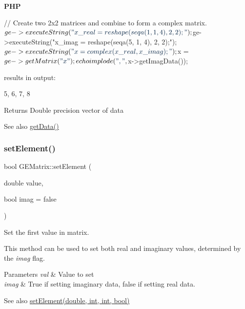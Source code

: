 {\bfseries P\+HP} 
\begin{DoxyCode}
\textcolor{comment}{// Create two 2x2 matrices and combine to form a complex matrix.}
$ge->executeString(\textcolor{stringliteral}{"x\_real = reshape(seqa(1, 1, 4), 2, 2);"});
$ge->executeString(\textcolor{stringliteral}{"x\_imag = reshape(seqa(5, 1, 4), 2, 2);"});
$ge->executeString(\textcolor{stringliteral}{"x = complex(x\_real, x\_imag);"});
$x = $ge->getMatrix(\textcolor{stringliteral}{"x"});
echo implode(\textcolor{stringliteral}{", "}, $x->getImagData());
\end{DoxyCode}
 results in output\+: 
\begin{DoxyCode}
5, 6, 7, 8
\end{DoxyCode}


\begin{DoxyReturn}{Returns}
Double precision vector of data
\end{DoxyReturn}
\begin{DoxySeeAlso}{See also}
\hyperlink{class_g_e_matrix_a49482e136fe25e61e8afc3eb2355146b}{get\+Data()} 
\end{DoxySeeAlso}
\mbox{\label{class_g_e_matrix_a9cb8b883469fb739b326d4d4a6ca9b4f}} 
\subsubsection{\texorpdfstring{set\+Element()}{setElement()}\hspace{0.1cm}{\footnotesize\ttfamily [1/3]}}
{\footnotesize\ttfamily bool G\+E\+Matrix\+::set\+Element (\begin{DoxyParamCaption}\item[{double}]{value,  }\item[{bool}]{imag = {\ttfamily false} }\end{DoxyParamCaption})}



Set the first value in matrix. 

This method can be used to set both real and imaginary values, determined by the {\itshape imag} flag.


\begin{DoxyParams}{Parameters}
{\em val} & Value to set \\
\hline
{\em imag} & True if setting imaginary data, false if setting real data.\\
\hline
\end{DoxyParams}
\begin{DoxySeeAlso}{See also}
\hyperlink{class_g_e_matrix_aaadecf68d646c2575446e7c1e2307047}{set\+Element(double, int, int, bool)} 
\end{DoxySeeAlso}
\mbox{\label{class_g_e_matrix_a10f13d07ac7a962d90a58133cd9dd360}} 
